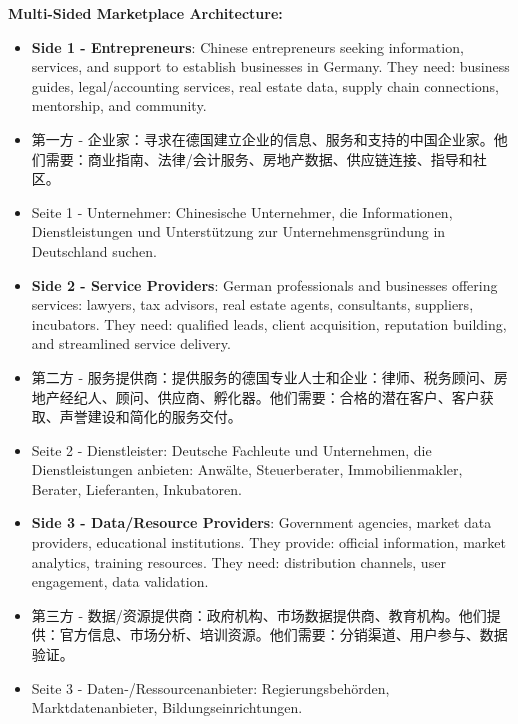 \textbf{Multi-Sided Marketplace Architecture:}
\begin{itemize}
    \item \textbf{Side 1 - Entrepreneurs}: Chinese entrepreneurs seeking information, services, and support to establish businesses in Germany. They need: business guides, legal/accounting services, real estate data, supply chain connections, mentorship, and community.
    \item 第一方 - 企业家：寻求在德国建立企业的信息、服务和支持的中国企业家。他们需要：商业指南、法律/会计服务、房地产数据、供应链连接、指导和社区。
    \item Seite 1 - Unternehmer: Chinesische Unternehmer, die Informationen, Dienstleistungen und Unterstützung zur Unternehmensgründung in Deutschland suchen.
    
    \item \textbf{Side 2 - Service Providers}: German professionals and businesses offering services: lawyers, tax advisors, real estate agents, consultants, suppliers, incubators. They need: qualified leads, client acquisition, reputation building, and streamlined service delivery.
    \item 第二方 - 服务提供商：提供服务的德国专业人士和企业：律师、税务顾问、房地产经纪人、顾问、供应商、孵化器。他们需要：合格的潜在客户、客户获取、声誉建设和简化的服务交付。
    \item Seite 2 - Dienstleister: Deutsche Fachleute und Unternehmen, die Dienstleistungen anbieten: Anwälte, Steuerberater, Immobilienmakler, Berater, Lieferanten, Inkubatoren.
    
    \item \textbf{Side 3 - Data/Resource Providers}: Government agencies, market data providers, educational institutions. They provide: official information, market analytics, training resources. They need: distribution channels, user engagement, data validation.
    \item 第三方 - 数据/资源提供商：政府机构、市场数据提供商、教育机构。他们提供：官方信息、市场分析、培训资源。他们需要：分销渠道、用户参与、数据验证。
    \item Seite 3 - Daten-/Ressourcenanbieter: Regierungsbehörden, Marktdatenanbieter, Bildungseinrichtungen.
\end{itemize}

